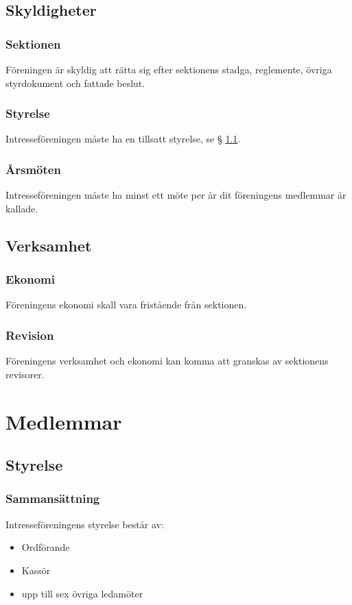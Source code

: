 \documentclass[11pt, noincludeaddress]{classes/cthit}
\begin{document}
\subsection{Skyldigheter}

\subsubsection{Sektionen}
Föreningen är skyldig att rätta sig efter sektionens stadga, reglemente, övriga styrdokument och fattade beslut. 

\subsubsection{Styrelse}
Intresseföreningen måste ha en tillsatt styrelse, se § \ref{styrelse}. 

\subsubsection{Årsmöten}
Intresseföreningen måste ha minst ett möte per år dit föreningens medlemmar är kallade. 

\subsection{Verksamhet}
\subsubsection{Ekonomi}
Föreningens ekonomi skall vara fristående från sektionen.

\subsubsection{Revision}
Föreningens verksamhet och ekonomi kan komma att granskas av sektionens revisorer.

\newpage

\section{Medlemmar}

\subsection{Styrelse}
\label{styrelse}

\subsubsection{Sammansättning}
Intresseföreningens styrelse består av: 
\begin{itemize}
    \item Ordförande
    \item Kassör
    \item upp till sex övriga ledamöter
\end{itemize}
\end{document}
